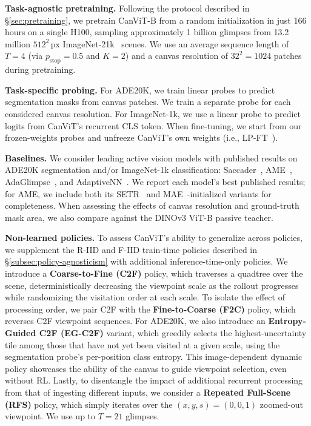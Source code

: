 \documentclass{article}
\begin{document}
\textbf{Task-agnostic pretraining.}
Following the protocol described in \S\ref{sec:pretraining},
we pretrain CanViT-B from a random initialization
in just 166 hours on a single H100,
sampling approximately 1 billion glimpses
from 13.2 million $512^2\,\text{px}$ ImageNet-21k~\cite{russakovskyImageNetLargeScale2015,ridnikImageNet21KPretrainingMasses2021} scenes.
We use an average sequence length of $T = 4$ (via $p_{\mathrm{stop}} = 0.5$ and $K = 2$) and a canvas resolution of $32^2 = 1024$ patches during pretraining.

\textbf{Task-specific probing.}
For ADE20K, we train linear probes to predict segmentation masks from canvas patches.
We train a separate probe for each considered canvas resolution.
For ImageNet-1k, we use a linear probe to predict logits from CanViT's recurrent CLS token.
When fine-tuning, we start from our frozen-weights probes and unfreeze CanViT's own weights (i.e., LP-FT~\cite{kumarFineTuningCanDistort2022}).


\textbf{Baselines.}
We consider leading active vision models with published results on ADE20K segmentation and/or ImageNet-1k classification:
Saccader~\cite{elsayedSaccaderImprovingAccuracy2019},
AME~\cite{AMEPardylRK0T23},
AdaGlimpse~\cite{pardylAdaGlimpseActiveVisual2025},
and AdaptiveNN~\cite{wangEmulatingHumanlikeAdaptive2025}.
We report each model's best published results;
for AME, we include both its SETR~\cite{zhengRethinkingSemanticSegmentation2021} and MAE~\cite{heMaskedAutoencodersAre2022}-initialized variants for completeness.
When assessing the effects of canvas resolution and ground-truth mask area, we also compare against the DINOv3 ViT-B passive teacher.

\textbf{Non-learned policies.}
To assess CanViT's ability to generalize across policies,
we supplement the R-IID and F-IID train-time policies described in \S\ref{subsec:policy-agnosticism}
with additional inference-time-only policies.
We introduce a \textbf{Coarse-to-Fine (C2F)} policy,
which traverses a quadtree over the scene,
deterministically decreasing the viewpoint scale as the rollout progresses
while randomizing the visitation order at each scale.
To isolate the effect of processing order,
we pair C2F with the \textbf{Fine-to-Coarse (F2C)} policy,
which reverses C2F viewpoint sequences.
For ADE20K, we also introduce an \textbf{Entropy-Guided C2F (EG-C2F)} variant,
which greedily selects the highest-uncertainty tile among those that have not yet been visited at a given scale,
using the segmentation probe's per-position class entropy.
This image-dependent dynamic policy showcases the ability of the canvas to guide viewpoint selection, even without \ac{RL}.
Lastly, to disentangle the impact of additional recurrent processing from that of ingesting different inputs,
we consider a \textbf{Repeated Full-Scene (RFS)} policy,
which simply iterates over the $(x,y,s)=(0,0,1)$ zoomed-out viewpoint.
We use up to $T = 21$ glimpses.
\end{document}
